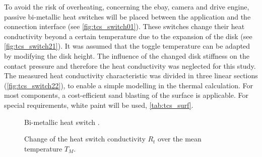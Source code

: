 To avoid the risk of overheating, concerning the ebay, camera and drive engine, passive bi-metallic heat switches  will be  placed between the application and the connection interface (see \autoref{fig:tcs_switch01}).
These switches change their heat conductivity beyond a certain temperature due to the expansion of the disk (see \autoref{fig:tcs_switch21}).
It was assumed that the toggle temperature can be adapted by modifying the disk height.
The influence of the changed disk stiffness on the contact pressure and therefore the heat conductivity was neglected for this study.
The measured heat conductivity characteristic was divided in three linear sections (\autoref{fig:tcs_switch22}), to enable a simple modelling in the thermal calculation.
For most components, a cost-efficient sand blasting of the surface is applicable.
For special requirements, white paint will be used, \autoref{tab:tcs_surf}.

\begin{figure}[H]
	\centering
	\qquad\qquad
	\caption{Bi-metallic heat switch \cite{ref_tcs_04}.}
	\label{fig:tcs_switch01}
\end{figure}

\begin{figure}[H]
	\centering
	\qquad
	\caption{Change of the heat switch conductivity $R_t$ over the mean temperature $T_M$.}
	\label{fig:tcs_switch02}
\end{figure}

